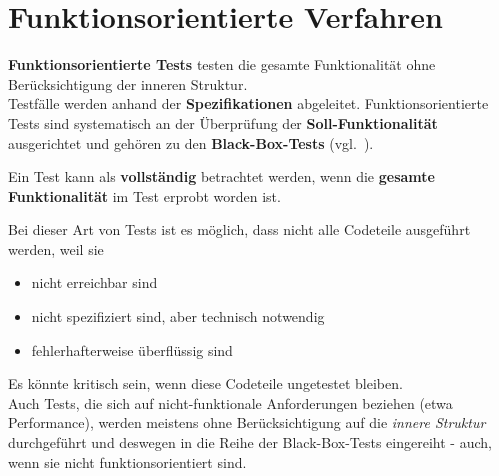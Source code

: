 \section{Funktionsorientierte Verfahren}

\begin{tcolorbox}[title=Funktionsorientierte Verfahren]
   \textbf{Funktionsorientierte Tests} testen die gesamte Funktionalität ohne Berücksichtigung der inneren Struktur.\\
   Testfälle werden anhand der \textbf{Spezifikationen} abgeleitet.
   Funktionsorientierte Tests sind systematisch an der Überprüfung der \textbf{Soll-Funktionalität} ausgerichtet und gehören zu den \textbf{Black-Box-Tests}  (vgl.~\cite[50 f.]{Lig09b}).

    Ein Test kann als \textbf{vollständig} betrachtet werden, wenn die \textbf{gesamte Funktionalität} im Test erprobt worden ist.\\
        \item[] Bei dieser Art von Tests ist es möglich, dass nicht alle Codeteile ausgeführt werden, weil sie
        \begin{itemize}
            \item nicht erreichbar sind
            \item nicht spezifiziert sind, aber technisch notwendig
            \item fehlerhafterweise überflüssig sind
        \end{itemize}
        \noindent
        Es könnte kritisch sein, wenn diese Codeteile ungetestet bleiben.\\
        Auch Tests, die sich auf nicht-funktionale Anforderungen beziehen (etwa Performance), werden meistens ohne Berücksichtigung auf die \textit{innere Struktur} durchgeführt und deswegen in die Reihe der Black-Box-Tests eingereiht - auch, wenn sie nicht funktionsorientiert sind.
\end{tcolorbox}